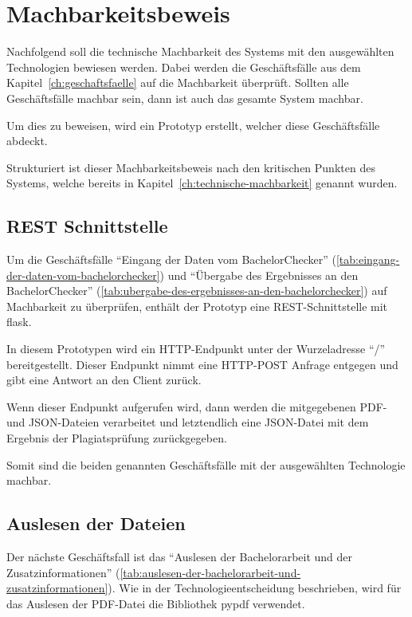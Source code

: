 
\section{Machbarkeitsbeweis}\label{sec:machbarkeitsbeweis}

Nachfolgend soll die technische Machbarkeit des Systems mit den ausgewählten Technologien bewiesen werden.
Dabei werden die Geschäftsfälle aus dem Kapitel~\ref{ch:geschaftsfaelle} auf die Machbarkeit überprüft.
Sollten alle Geschäftsfälle machbar sein, dann ist auch das gesamte System machbar.

Um dies zu beweisen, wird ein Prototyp erstellt, welcher diese Geschäftsfälle abdeckt.

Strukturiert ist dieser Machbarkeitsbeweis nach den kritischen Punkten des Systems,
welche bereits in Kapitel~\ref{ch:technische-machbarkeit} genannt wurden.

\subsection{REST Schnittstelle}\label{subsec:rest-schnittstelle}
Um die Geschäftsfälle ``Eingang der Daten vom BachelorChecker'' (\ref{tab:eingang-der-daten-vom-bachelorchecker}) 
und ``Übergabe des Ergebnisses an den BachelorChecker'' (\ref{tab:ubergabe-des-ergebnisses-an-den-bachelorchecker})
auf Machbarkeit zu überprüfen, enthält der Prototyp eine REST-Schnittstelle mit flask.

In diesem Prototypen wird ein HTTP-Endpunkt unter der Wurzeladresse ``/'' bereitgestellt.
Dieser Endpunkt nimmt eine HTTP-POST Anfrage entgegen und gibt eine Antwort an den Client zurück.

Wenn dieser Endpunkt aufgerufen wird, dann werden die mitgegebenen PDF- und JSON-Dateien verarbeitet
und letztendlich eine JSON-Datei mit dem Ergebnis der Plagiatsprüfung zurückgegeben.

Somit sind die beiden genannten Geschäftsfälle mit der ausgewählten Technologie machbar.

\subsection{Auslesen der Dateien}\label{subsec:auslesen-der-dateien}
Der nächste Geschäftsfall ist das ``Auslesen der Bachelorarbeit und der Zusatzinformationen'' (\ref{tab:auslesen-der-bachelorarbeit-und-zusatzinformationen}).
Wie in der Technologieentscheidung beschrieben, wird für das Auslesen der PDF-Datei die Bibliothek pypdf verwendet.

